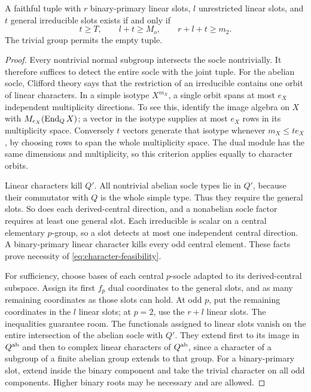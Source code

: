 \begin{theorem}\label{thm:character-feasibility}
A faithful tuple with $r$ binary-primary linear slots, $l$ unrestricted
linear slots, and $t$ general irreducible slots exists if and only if
\begin{equation}\label{eq:character-feasibility}
 t\geq T,\qquad l+t\geq M_o,\qquad r+l+t\geq m_2.
\end{equation}
The trivial group permits the empty tuple.
\end{theorem}
\begin{proof}
Every nontrivial normal subgroup intersects the socle nontrivially.
It therefore suffices to detect the entire socle with the joint tuple.
For the abelian socle, Clifford theory says that the restriction of an
irreducible contains one orbit of linear characters. In a simple
isotype $X^{m_X}$, a single orbit spans at most $e_X$ independent
multiplicity directions. To see this, identify the image algebra on
$X$ with $M_{e_X}(\operatorname{End}_QX)$; a vector in the isotype supplies at most
$e_X$ rows in its multiplicity space. Conversely $t$ vectors generate
that isotype whenever $m_X\leq te_X$, by choosing rows to span the
whole multiplicity space. The dual module has the same dimensions
and multiplicity, so this criterion applies equally to character orbits.

Linear characters kill $Q'$. All nontrivial abelian socle types lie
in $Q'$, because their commutator with $Q$ is the whole simple type.
Thus they require the general slots. So does each derived-central
direction, and a nonabelian socle factor requires at least one general
slot. Each irreducible is scalar on a central elementary $p$-group,
so a slot detects at most one independent central direction. A
binary-primary linear character kills every odd central element.
These facts prove necessity of \eqref{eq:character-feasibility}.

For sufficiency, choose bases of each central $p$-socle adapted to its
derived-central subspace. Assign its first $f_p$ dual coordinates to
the general slots, and as many remaining coordinates as those slots
can hold. At odd $p$, put the remaining coordinates in the $l$ linear
slots; at $p=2$, use the $r+l$ linear slots. The inequalities guarantee
room. The functionals assigned to linear slots vanish on the entire
intersection of the abelian socle with $Q'$. They extend first to its
image in $Q^{\rm ab}$ and then to complex linear characters of
$Q^{\rm ab}$, since a character of a subgroup of a finite abelian
group extends to that group. For a binary-primary slot, extend inside
the binary component and take the trivial character on all odd
components. Higher binary roots may be necessary and are allowed.


\end{proof}
